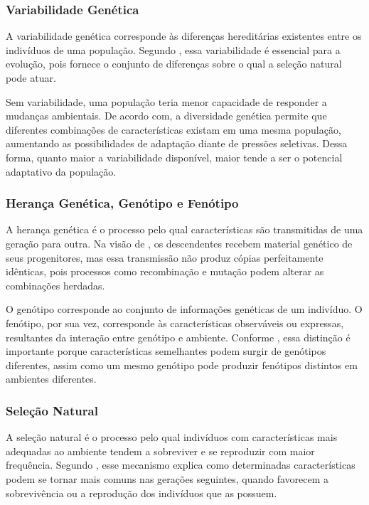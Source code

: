 \subsubsection{Variabilidade Genética}
\label{subsubsec:variabilidade-genetica}

A variabilidade genética corresponde às diferenças hereditárias existentes entre os indivíduos de uma população. Segundo , essa variabilidade é essencial para a evolução, pois fornece o conjunto de diferenças sobre o qual a seleção natural pode atuar.

Sem variabilidade, uma população teria menor capacidade de responder a mudanças ambientais. De acordo com, a diversidade genética permite que diferentes combinações de características existam em uma mesma população, aumentando as possibilidades de adaptação diante de pressões seletivas. Dessa forma, quanto maior a variabilidade disponível, maior tende a ser o potencial adaptativo da população.

\subsubsection{Herança Genética, Genótipo e Fenótipo}
\label{subsubsec:heranca-genetica-genotipo-fenotipo}

A herança genética é o processo pelo qual características são transmitidas de uma geração para outra. Na visão de , os descendentes recebem material genético de seus progenitores, mas essa transmissão não produz cópias perfeitamente idênticas, pois processos como recombinação e mutação podem alterar as combinações herdadas.

O genótipo corresponde ao conjunto de informações genéticas de um indivíduo. O fenótipo, por sua vez, corresponde às características observáveis ou expressas, resultantes da interação entre genótipo e ambiente. Conforme , essa distinção é importante porque características semelhantes podem surgir de genótipos diferentes, assim como um mesmo genótipo pode produzir fenótipos distintos em ambientes diferentes.

\subsubsection{Seleção Natural}
\label{subsubsec:selecao-natural}

A seleção natural é o processo pelo qual indivíduos com características mais adequadas ao ambiente tendem a sobreviver e se reproduzir com maior frequência. Segundo , esse mecanismo explica como determinadas características podem se tornar mais comuns nas gerações seguintes, quando favorecem a sobrevivência ou a reprodução dos indivíduos que as possuem.

